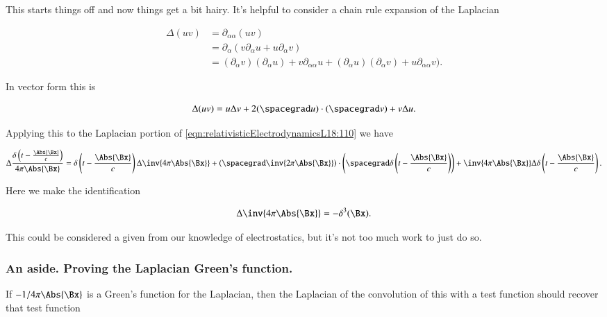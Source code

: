 This starts things off and now things get a bit hairy.  It's helpful to consider a chain rule expansion of the Laplacian

\begin{align*}
\Delta (u v)
&=
\partial_{\alpha\alpha} (u v) \\
&=
\partial_{\alpha} (
v \partial_\alpha u
+ u\partial_\alpha v
) \\
&=
(\partial_\alpha v) (\partial_\alpha u ) + v \partial_{\alpha\alpha} u
+(\partial_\alpha u) (\partial_\alpha v ) + u \partial_{\alpha\alpha} v
).
\end{align*}

In vector form this is

\begin{equation}\label{eqn:relativisticElectrodynamicsL18:130}
\Delta (u v) = u \Delta v + 2 (\spacegrad u) \cdot (\spacegrad v) + v \Delta u.
\end{equation}

Applying this to the Laplacian portion of \ref{eqn:relativisticElectrodynamicsL18:110} we have

\begin{equation}\label{eqn:relativisticElectrodynamicsL18:131}
\Delta \frac{\delta\left(t - \frac{\Abs{\Bx}}{c}\right)}{4 \pi \Abs{\Bx} }
=
\delta\left(t - \frac{\Abs{\Bx}}{c}\right)
\Delta
\inv{4 \pi \Abs{\Bx} }
+\left(\spacegrad \inv{2 \pi \Abs{\Bx} }\right)
\cdot
\left(
\spacegrad
\delta\left(t - \frac{\Abs{\Bx}}{c}\right) \right)
+
\inv{4 \pi \Abs{\Bx} }
\Delta
\delta\left(t - \frac{\Abs{\Bx}}{c}\right).
\end{equation}

Here we make the identification

\begin{equation}\label{eqn:relativisticElectrodynamicsL18:132}
\Delta \inv{4 \pi \Abs{\Bx} } = - \delta^3(\Bx).
\end{equation}

This could be considered a given from our knowledge of electrostatics, but it's not too much work to just do so.

\subsubsection{An aside.  Proving the Laplacian Green's function.}

If $-1/{4 \pi \Abs{\Bx} }$ is a Green's function for the Laplacian, then the Laplacian of the convolution of this with a test function should recover that test function

